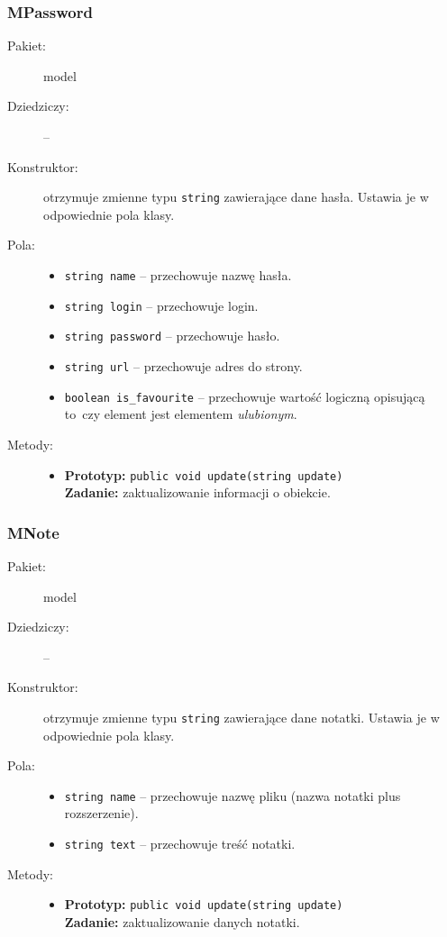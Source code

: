 \documentclass[a4paper]{article}
\newcommand{\prog}{\texttt}
\begin{document}
\subsubsection{MPassword}
\begin{description}
    \item[Pakiet:] model
    \item[Dziedziczy:] --
    \item[Konstruktor:] otrzymuje zmienne typu \prog{string} zawierające dane hasła. Ustawia je w odpowiednie pola klasy.
    \item[Pola:] \hfill
    \begin{itemize}
        \item \prog{string name} -- przechowuje nazwę hasła.
        \item \prog{string login} -- przechowuje login.
        \item \prog{string password} -- przechowuje hasło.
        \item \prog{string url} -- przechowuje adres do strony.
        \item \prog{boolean is\_favourite} -- przechowuje wartość logiczną opisującą to~czy element jest elementem \textit{ulubionym}.
    \end{itemize}
    \item[Metody:] \hfill
    \begin{itemize}
      \item \textbf{Prototyp:} \prog{public void update(string update)}\\\textbf{Zadanie:} zaktualizowanie informacji o obiekcie.
    \end{itemize}
\end{description}

\subsubsection{MNote}
\begin{description}
    \item[Pakiet:] model
    \item[Dziedziczy:] --
    \item[Konstruktor:] otrzymuje zmienne typu \prog{string} zawierające dane notatki. Ustawia je w odpowiednie pola klasy.
    \item[Pola:] \hfill
    \begin{itemize}
        \item \prog{string name} -- przechowuje nazwę pliku (nazwa notatki plus rozszerzenie).
        \item \prog{string text} -- przechowuje treść notatki.
    \end{itemize}
    \item[Metody:] \hfill
    \begin{itemize}
        \item \textbf{Prototyp:} \prog{public void update(string update)}\\\textbf{Zadanie:} zaktualizowanie danych notatki.
    \end{itemize}
\end{description}
\end{document}
